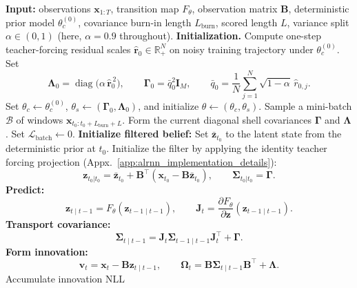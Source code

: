 \documentclass{article}
\theoremstyle{plain}
\theoremstyle{definition}
\theoremstyle{remark}
\begin{document}
\begin{algorithm}[!htpb]
\caption{KAFFEE optimization protocol}
\label{alg:kaffee_opt}
\begin{algorithmic}[1]
\STATE \textbf{Input:} observations $\bm x_{1:T}$, transition map $F_\theta$, observation matrix $\bm B$, deterministic prior model $\theta_c^{(0)}$, covariance burn-in length $L_{\mathrm{burn}}$, scored length $L$, variance split $\alpha\in(0,1)$ (here, $\alpha = 0.9$ throughout).
\STATE \textbf{Initialization.} Compute one-step teacher-forcing residual scales $\hat{\bm r}_0\in\mathbb R_+^N$ on noisy training trajectory under $\theta_c^{(0)}$. Set
\[
\bm \Lambda_0
=
\operatorname{diag} \big(\alpha\,\hat{\bm r}_0^{\,2}\big),
\qquad
\bm \Gamma_0
=
\bar q_0^2\bm I_M,
\qquad
\bar q_0
=
\frac{1}{N}
\sum_{j=1}^N
\sqrt{1-\alpha}\,\hat r_{0,j}.
\]
Set $\theta_c\leftarrow\theta_c^{(0)}$, $\theta_s \leftarrow(\bm\Gamma_0,\bm\Lambda_0)$, and initialize $\theta \leftarrow (\theta_c,\theta_s)$.
    \STATE Sample a mini-batch $\mathcal B$ of windows
    $\bm x_{t_0:t_0+L_{\mathrm{burn}}+L}$.
    \STATE Form the current diagonal shell covariances $\bm\Gamma$ and $\bm\Lambda$.
    \STATE Set $\mathcal L_{\mathrm{batch}}\leftarrow 0$.
    \STATE \textbf{Initialize filtered belief:} 
    Set $\bar{\bm z}_{t_0}$ to the latent state from the deterministic prior at $t_0$. Initialize the filter by applying the identity teacher forcing projection (Appx.~\ref{app:alrnn_implementation_details}):
        \[
        \bm z_{t_0|t_0} = \bar{\bm z}_{t_0} + \bm B^\top(\bm x_{t_0} - \bm B\bar{\bm z}_{t_0}),
        \qquad
        \bm\Sigma_{t_0|t_0} = \bm\Gamma.
        \]
            \STATE \textbf{Predict:}
            \[
            \bm z_{t\mid t-1}=F_\theta(\bm z_{t-1\mid t-1}),
            \qquad
            \bm J_t
            =
            \frac{\partial F_\theta}{\partial \bm z}(\bm z_{t-1\mid t-1}) .
            \]
            \STATE \textbf{Transport covariance:}
            \[
            \bm\Sigma_{t\mid t-1}
            =
            \bm J_t\bm\Sigma_{t-1\mid t-1}\bm J_t^\top
            +
            \bm\Gamma .
            \]
            \STATE \textbf{Form innovation:}
            \[
            \bm v_t
            =
            \bm x_t-\bm B\bm z_{t\mid t-1},
            \qquad
            \bm\Omega_t
            =
            \bm B\bm\Sigma_{t\mid t-1}\bm B^\top+\bm\Lambda .
            \]
                \STATE Accumulate innovation NLL

\end{algorithmic}
\end{algorithm}
\end{document}
